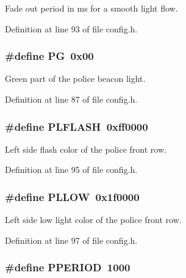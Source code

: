 Fade out period in ms for a smooth light flow. 



Definition at line 93 of file config.\+h.

\subsubsection[{\texorpdfstring{PG}{PG}}]{\setlength{\rightskip}{0pt plus 5cm}\#define PG~0x00}\hypertarget{group__police_ga037f1be1c3e45bf4d0d4f5ddc159ff30}{}\label{group__police_ga037f1be1c3e45bf4d0d4f5ddc159ff30}


Green part of the police beacon light. 



Definition at line 87 of file config.\+h.

\subsubsection[{\texorpdfstring{P\+L\+F\+L\+A\+SH}{PLFLASH}}]{\setlength{\rightskip}{0pt plus 5cm}\#define P\+L\+F\+L\+A\+SH~0xff0000}\hypertarget{group__police_ga6204e236d3e4ef0beb5b6fd976fecf43}{}\label{group__police_ga6204e236d3e4ef0beb5b6fd976fecf43}


Left side flash color of the police front row. 



Definition at line 95 of file config.\+h.

\subsubsection[{\texorpdfstring{P\+L\+L\+OW}{PLLOW}}]{\setlength{\rightskip}{0pt plus 5cm}\#define P\+L\+L\+OW~0x1f0000}\hypertarget{group__police_ga98673c164f8917ff7af0016ba30e7ca8}{}\label{group__police_ga98673c164f8917ff7af0016ba30e7ca8}


Left side low light color of the police front row. 



Definition at line 97 of file config.\+h.

\subsubsection[{\texorpdfstring{P\+P\+E\+R\+I\+OD}{PPERIOD}}]{\setlength{\rightskip}{0pt plus 5cm}\#define P\+P\+E\+R\+I\+OD~1000}\hypertarget{group__police_gaa5b3f73b18472f543c080194bf9c2e79}{}\label{group__police_gaa5b3f73b18472f543c080194bf9c2e79}


